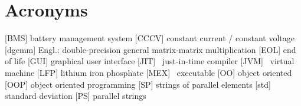 \section*{Acronyms}
\thispagestyle{plain}
\begin{acronym}
	[BMS] battery management system
	[CCCV] constant current / constant voltage
	[dgemm] Engl.: double-precision general matrix-matrix multiplication
	[EOL] end of life
	[GUI] graphical user interface
	[JIT] \matlab\ just-in-time compiler
	[JVM] \java\ virtual machine
	[LFP] lithium iron phosphate
	[MEX] \matlab\ executable
	[OO] object oriented
	[OOP] object oriented programming
	[SP] strings of parallel elements
	[std] standard deviation
	[PS] parallel strings
\end{acronym}
